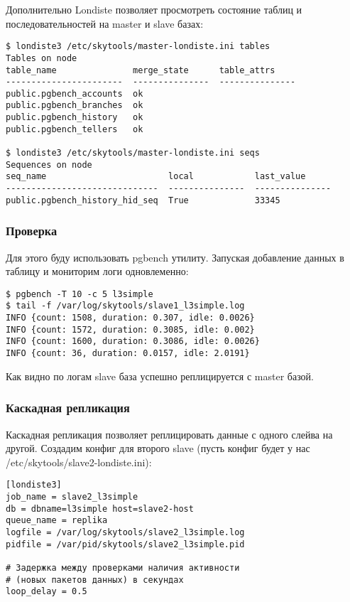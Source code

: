 Дополнительно Londiste позволяет просмотреть состояние таблиц и последовательностей на master и slave базах:

\begin{lstlisting}[label=lst:londiste-replica17,caption=Статус таблиц и последовательностей]
$ londiste3 /etc/skytools/master-londiste.ini tables
Tables on node
table_name               merge_state      table_attrs
-----------------------  ---------------  ---------------
public.pgbench_accounts  ok
public.pgbench_branches  ok
public.pgbench_history   ok
public.pgbench_tellers   ok

$ londiste3 /etc/skytools/master-londiste.ini seqs
Sequences on node
seq_name                        local            last_value
------------------------------  ---------------  ---------------
public.pgbench_history_hid_seq  True             33345
\end{lstlisting}



\subsubsection{Проверка}

Для этого буду использовать pgbench утилиту. Запуская добавление данных в таблицу и мониторим логи одновлеменно:

\begin{lstlisting}[label=lst:londiste-check1,caption=Проверка]
$ pgbench -T 10 -c 5 l3simple
$ tail -f /var/log/skytools/slave1_l3simple.log
INFO {count: 1508, duration: 0.307, idle: 0.0026}
INFO {count: 1572, duration: 0.3085, idle: 0.002}
INFO {count: 1600, duration: 0.3086, idle: 0.0026}
INFO {count: 36, duration: 0.0157, idle: 2.0191}
\end{lstlisting}

Как видно по логам slave база успешно реплицируется с master базой.


\subsubsection{Каскадная репликация}

Каскадная репликация позволяет реплицировать данные с одного слейва на другой. Создадим конфиг для второго slave (пусть конфиг будет у нас /etc/skytools/slave2-londiste.ini):

\begin{lstlisting}[label=lst:londiste-cascade1,caption=Конфиг для slave2]
[londiste3]
job_name = slave2_l3simple
db = dbname=l3simple host=slave2-host
queue_name = replika
logfile = /var/log/skytools/slave2_l3simple.log
pidfile = /var/pid/skytools/slave2_l3simple.pid

# Задержка между проверками наличия активности
# (новых пакетов данных) в секундах
loop_delay = 0.5
\end{lstlisting}

